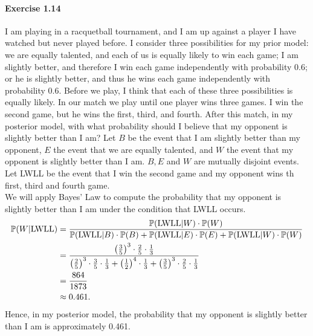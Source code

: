 \paragraph{Exercise 1.14} I am playing in a racquetball tournament, and I am up
against a player I have watched but never played before. I consider three
possibilities for my prior model: we are equally talented, and each of us is equally
likely to win each game; I am slightly better, and therefore I win each game
independently with probability 0.6; or he is slightly better, and thus he wins
each game independently with probability 0.6. Before we play, I think that each
of these three possibilities is equally likely. In our match we play until one
player wins three games. I win the second game, but he wins the first, third, and
fourth. After this match, in my posterior model, with what probability should I
believe that my opponent is slightly better than I am?
Let $B$ be the event that I am slightly better than my opponent, $E$ the event that
we are equally talented, and $W$ the event that my opponent is slightly better than
I am. $B, E$ and $W$ are mutually disjoint events. Let LWLL be the event that I
win the second game and my opponent wins th first, third and fourth game. \\
We will apply Bayes' Law to compute the probability that my opponent is slightly
better than I am under the condition that LWLL occurs.
\begin{align*}
  \mathbb{P}(W|\text{LWLL})
    &= \frac{\mathbb{P}(\text{LWLL}|W) \cdot \mathbb{P}(W)}{\mathbb{P}(\text{LWLL}|B) \cdot \mathbb{P}(B) + \mathbb{P}(\text{LWLL}|E) \cdot \mathbb{P}(E) + \mathbb{P}(\text{LWLL}|W) \cdot \mathbb{P}(W)} \\
    &= \frac{\left(\frac{3}{5}\right)^3 \cdot \frac{2}{5} \cdot \frac{1}{3}} {\left( \frac{2}{5} \right)^3 \cdot \frac{3}{5} \cdot \frac{1}{3} + \left( \frac{1}{2} \right) ^4 \cdot \frac{1}{3} + \left(\frac{3}{5}\right)^3 \cdot \frac{2}{5} \cdot \frac{1}{3}} \\
    &= \frac{864}{1873} \\
    &\approx 0.461.
\end{align*}
Hence, in my posterior model, the probability that my opponent is slightly better
than I am is approximately 0.461.
